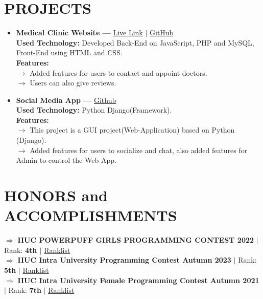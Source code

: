 \documentclass[a4paper,10pt]{article}
\begin{document}
	
	
	\section*{PROJECTS}
	\begin{itemize}[left=0pt]
		\item \textbf{Medical Clinic Website — } \href{https://sabrina-mostafa.github.io/PROJECT_Medical-Clinic-Website/}{Live Link} $|$ \href{https://github.com/sabrina-mostafa/PROJECT_Medical-Clinic-Website}{GitHub}\\
		\textbf{Used Technology:} Developed Back-End on JavaScript, PHP and MySQL, Front-End using HTML and CSS.\\
		\textbf{Features:}\\
		$\rightarrow${ Added features for users to contact and appoint doctors.}\\
		$\rightarrow${ Users can also give reviews.}
		
		
		\item \textbf{Social Media App — } \href{https://github.com/sabrina-mostafa/PROJECT_Social-Media-App}{Github} \\
		\textbf{Used Technology:} Python Django(Framework).\\
		\textbf{Features:}\\
		$\rightarrow${ This project is a GUI project(Web-Application) based on Python (Django).}\\
		$\rightarrow${ Added features for users to socialize and chat, also added features for Admin to control the Web App.}
	\end{itemize}
	
	
	
	\section*{HONORS and ACCOMPLISHMENTS}
	$\Rightarrow$ \textbf{IIUC POWERPUFF GIRLS PROGRAMMING CONTEST 2022} $|$ Rank: \textbf{4th $|$} \href{https://toph.co/contests/training/jqftrv3/standings} {Ranklist} \\
	$\Rightarrow$ \textbf{IIUC Intra University Programming Contest Autumn 2023} $|$ Rank: \textbf{5th} $|$ \href{https://toph.co/contests/training/jtmncaq/standings} {Ranklist} \\
	$\Rightarrow$ \textbf{IIUC Intra University Female Programming Contest Autumn 2021} $|$ Rank: \textbf{7th} $|$ \href{https://toph.co/contests/training/qtgh8je/standings} {Ranklist}
	
\end{document}
